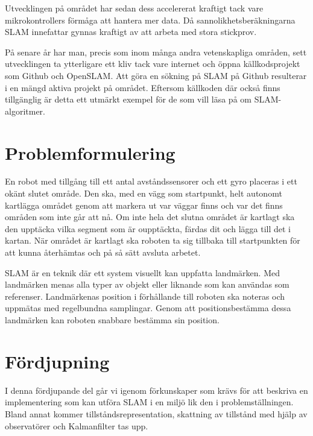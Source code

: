 \documentclass[a4paper,12pt,fleqn]{article}
\begin{document}
Utvecklingen på området har sedan dess accelererat kraftigt tack vare
mikrokontrollers förmåga att hantera mer data. Då sannolikhetsberäkningarna SLAM innefattar gynnas kraftigt av att arbeta med stora stickprov. 

På senare år har man, precis som inom många andra vetenskapliga områden, sett utvecklingen ta ytterligare ett kliv tack vare internet och öppna källkodsprojekt som Github och OpenSLAM. Att göra en sökning på SLAM på Github resulterar i en mängd aktiva projekt på området. Eftersom källkoden där också finns tillgänglig är detta ett utmärkt exempel för de som vill läsa på om SLAM-algoritmer. 


\section{Problemformulering}

En robot med tillgång till ett antal avståndssensorer och ett gyro placeras i ett okänt slutet område. Den ska, med en vägg som startpunkt, helt autonomt kartlägga området genom att markera ut var väggar finns och var det finns områden som inte går att nå. Om inte hela det slutna området är kartlagt ska den upptäcka vilka segment som är oupptäckta, färdas dit och lägga till det i kartan. När området är kartlagt ska roboten ta sig tillbaka till startpunkten för att kunna återhämtas och på så sätt avsluta arbetet. 

SLAM är en teknik där ett system visuellt kan uppfatta landmärken. Med landmärken menas alla typer av objekt eller liknande som kan användas som referenser. Landmärkenas position i förhållande till roboten ska noteras och uppmätas med regelbundna samplingar. Genom att positionsbestämma dessa landmärken kan roboten snabbare bestämma sin position. 



\newpage
\section{Fördjupning}
I denna fördjupande del går vi igenom förkunskaper som krävs för att beskriva en implementering som kan utföra SLAM i en miljö lik den i problemställningen. Bland annat kommer tillståndsrepresentation, skattning av tillstånd med hjälp av observatörer och Kalmanfilter tas upp.
\end{document}

